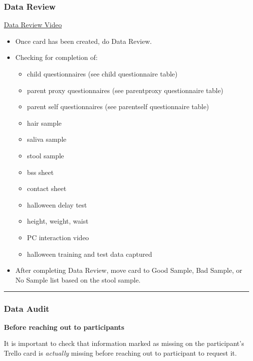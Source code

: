 \documentclass[
]{book}
\providecommand{\tightlist}{%
  \setlength{\itemsep}{0pt}\setlength{\parskip}{0pt}}
\begin{document}
\hypertarget{data-review}{%
\subsubsection{Data Review}\label{data-review}}

\href{https://youtu.be/z_mQGyguaEY}{Data Review Video}

\begin{itemize}
\tightlist
\item
  Once card has been created, do Data Review.
\item
  Checking for completion of:

  \begin{itemize}
  \tightlist
  \item
    child questionnaires (see child questionnaire table)
  \item
    parent proxy questionnaires (see parentproxy questionnaire table)
  \item
    parent self questionnaires (see parentself questionnaire table)
  \item
    hair sample
  \item
    saliva sample
  \item
    stool sample
  \item
    bss sheet
  \item
    contact sheet
  \item
    halloween delay test
  \item
    height, weight, waist
  \item
    PC interaction video
  \item
    halloween training and test data captured
  \end{itemize}
\item
  After completing Data Review, move card to Good Sample, Bad Sample, or No Sample list based on the stool sample.
\end{itemize}

\begin{center}\rule{0.5\linewidth}{0.5pt}\end{center}

\hypertarget{data-audit}{%
\subsubsection{Data Audit}\label{data-audit}}

\textbf{Before reaching out to participants}

It is important to check that information marked as missing on the participant's Trello card is \emph{actually} missing before reaching out to participant to request it.
\end{document}
